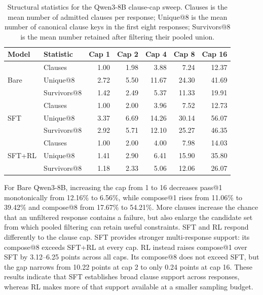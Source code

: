 \begin{table}[H]
\centering
\small
\setlength{\tabcolsep}{5pt}
\caption{Structural statistics for the Qwen3-8B clause-cap sweep.  Clauses
  is the mean number of admitted clauses per response; Unique@8 is the mean
  number of canonical clause keys in the first eight responses; Survivors@8 is
  the mean number retained after filtering their pooled union.}
\label{tab:clause-cap-structure}
\begin{tabular}{llrrrrr}
\toprule
\rowcolor{algobg}
Model & Statistic & Cap 1 & Cap 2 & Cap 4 & Cap 8 & Cap 16 \\
\midrule
\multirow{3}{*}{Bare}
 & Clauses       & 1.00 & 1.98 & 3.88 & 7.24 & 12.37 \\
 & Unique@8      & 2.72 & 5.50 & 11.67 & 24.30 & 41.69 \\
 & Survivors@8   & 1.42 & 2.49 & 5.37 & 11.33 & 19.91 \\
\midrule
\multirow{3}{*}{SFT}
 & Clauses       & 1.00 & 2.00 & 3.96 & 7.52 & 12.73 \\
 & Unique@8      & 3.37 & 6.69 & 14.26 & 30.14 & 56.07 \\
 & Survivors@8   & 2.92 & 5.71 & 12.10 & 25.27 & 46.35 \\
\midrule
\multirow{3}{*}{SFT+RL}
 & Clauses       & 1.00 & 2.00 & 4.00 & 7.98 & 14.03 \\
 & Unique@8      & 1.41 & 2.90 & 6.41 & 15.90 & 35.80 \\
 & Survivors@8   & 1.18 & 2.33 & 5.06 & 12.06 & 26.07 \\
\bottomrule
\end{tabular}
\end{table}

For Bare Qwen3-8B, increasing the cap from 1 to 16 decreases pass@1
monotonically from 12.16\% to 6.56\%, while compose@1 rises from 11.06\% to
39.42\% and compose@8 from 17.67\% to 54.21\%.  More clauses increase the
chance that an unfiltered response contains a failure, but also enlarge the
candidate set from which pooled filtering can retain useful constraints.
SFT and RL respond differently to the clause cap.  SFT provides stronger
multi-response support: its compose@8 exceeds SFT+RL at every cap.  RL instead
raises compose@1 over SFT by 3.12--6.25 points across all caps.  Its compose@8
does not exceed SFT, but the gap narrows from 10.22 points at cap 2 to only
0.24 points at cap 16.  These results indicate that SFT establishes broad
clause support across responses, whereas RL makes more of that support
available at a smaller sampling budget.

